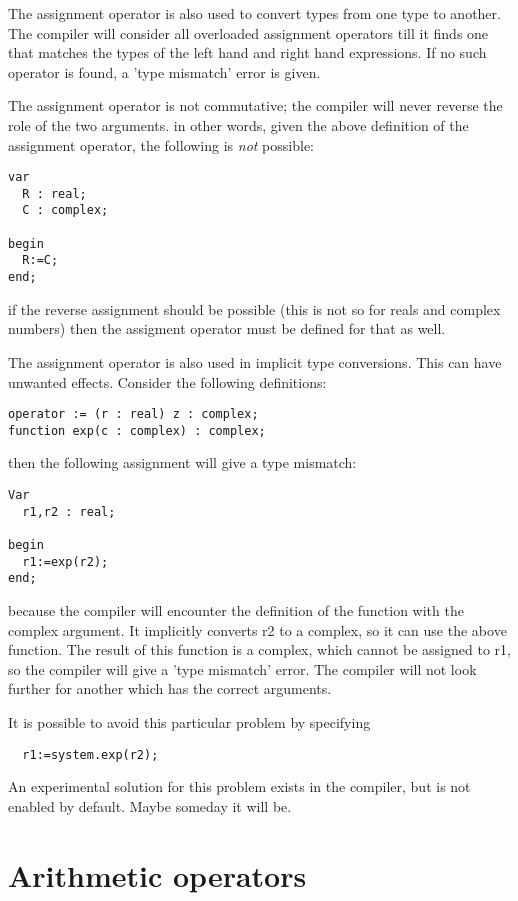 The assignment operator is also used to convert types from one type to
another. The compiler will consider all overloaded assignment operators
till it finds one that matches the types of the left hand and right hand
expressions. If no such operator is found, a 'type mismatch' error
is given.

\begin{remark}
The assignment operator is not commutative; the compiler will never reverse
the role of the two arguments. in other words, given the above definition of
the assignment operator, the following is {\em not} possible:
\begin{verbatim}
var
  R : real;
  C : complex;

begin
  R:=C;
end;
\end{verbatim}
if the reverse assignment should be possible (this is not so for reals and
complex numbers) then the assigment operator must be defined for that as well.
\end{remark}

\begin{remark}
The assignment operator is also used in implicit type conversions. This can
have unwanted effects. Consider the following definitions:
\begin{verbatim}
operator := (r : real) z : complex;
function exp(c : complex) : complex;
\end{verbatim}
then the following assignment will give a type mismatch:
\begin{verbatim}
Var
  r1,r2 : real;

begin
  r1:=exp(r2);
end;
\end{verbatim}
because the compiler will encounter the definition of the  function
with the complex argument. It implicitly converts r2 to a complex, so it can
use the above  function. The result of this function is a complex,
which cannot be assigned to r1, so the compiler will give a 'type mismatch'
error. The compiler will not look further for another  which has
the correct arguments.

It is possible to avoid this particular problem by specifying
\begin{verbatim}
  r1:=system.exp(r2);
\end{verbatim}
An experimental solution for this problem exists in the compiler, but is
not enabled by default. Maybe someday it will be.
\end{remark}

\section{Arithmetic operators}

